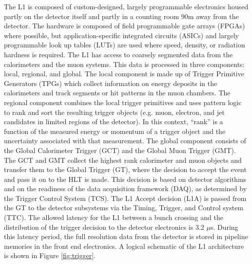 The L1 is composed of custom-designed, largely programmable electronics 
housed partly on the detector itself and partly in a counting room 90m away from the detector.
The hardware is composed of field programmable gate arrays (FPGAs)
where possible, but application-specific integrated circuits (ASICs)
and largely programmable look up tables (LUTs) 
are used where speed, density, or radiation hardness is required.
The L1 has access to coarsely segmented data from the calorimeters and the muon systems.
This data is processed in three components: local, regional, and global.
The local component is made up of Trigger Primitive Generators (TPGs)
 which collect information
on energy deposits in the calorimeters and track segments or hit patterns in the muon chambers.
The regional component combines the local trigger primitives and uses pattern logic to 
rank and sort the resulting trigger objects (e.g. muon, electron, and jet candidates in limited regions of the detector).
In this context, ``rank'' is a function of the measured energy or momentum of a trigger object and 
the uncertainty associated with that measurement.
The global component consists of the Global Calorimeter Trigger (GCT)
and the Global Muon Trigger (GMT).
The GCT and GMT
collect the highest rank calorimeter and muon objects 
and transfer them to the Global Trigger (GT), 
where the decision to
accept the event and pass it on to the HLT is made.  
This decision is based on detector algorithms and on the readiness
of the data acquisition framework (DAQ), 
as determined by the Trigger Control System (TCS).
The L1 Accept 
decision (L1A)  is passed from the GT to the detector
subsystems via the Timing, Trigger, and Control system (TTC).
The allowed latency for the L1 between a bunch crossing and the distribution of the trigger
decision to the detector electronics is 3.2 $\mu$s.  During this latency period,
the full resolution data from the detector is stored in pipeline memories in the front end electronics.
A logical schematic of the L1 architecture is shown in Figure \ref{fig:trigger}.

